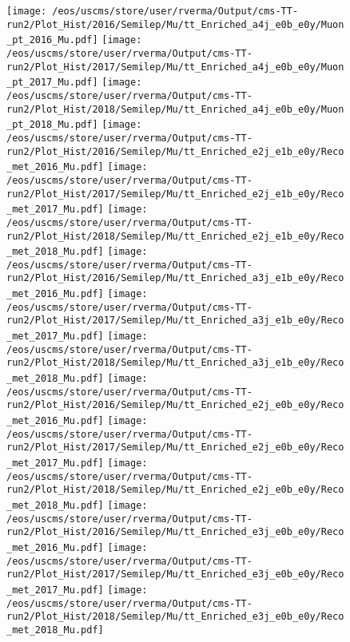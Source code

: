 \begin{figure}
\centering
\texttt{[image: /eos/uscms/store/user/rverma/Output/cms-TT-run2/Plot\_Hist/2016/Semilep/Mu/tt\_Enriched\_a4j\_e0b\_e0y/Muon\_pt\_2016\_Mu.pdf]}
\texttt{[image: /eos/uscms/store/user/rverma/Output/cms-TT-run2/Plot\_Hist/2017/Semilep/Mu/tt\_Enriched\_a4j\_e0b\_e0y/Muon\_pt\_2017\_Mu.pdf]}
\texttt{[image: /eos/uscms/store/user/rverma/Output/cms-TT-run2/Plot\_Hist/2018/Semilep/Mu/tt\_Enriched\_a4j\_e0b\_e0y/Muon\_pt\_2018\_Mu.pdf]}
\texttt{[image: /eos/uscms/store/user/rverma/Output/cms-TT-run2/Plot\_Hist/2016/Semilep/Mu/tt\_Enriched\_e2j\_e1b\_e0y/Reco\_met\_2016\_Mu.pdf]}
\texttt{[image: /eos/uscms/store/user/rverma/Output/cms-TT-run2/Plot\_Hist/2017/Semilep/Mu/tt\_Enriched\_e2j\_e1b\_e0y/Reco\_met\_2017\_Mu.pdf]}
\texttt{[image: /eos/uscms/store/user/rverma/Output/cms-TT-run2/Plot\_Hist/2018/Semilep/Mu/tt\_Enriched\_e2j\_e1b\_e0y/Reco\_met\_2018\_Mu.pdf]}
\texttt{[image: /eos/uscms/store/user/rverma/Output/cms-TT-run2/Plot\_Hist/2016/Semilep/Mu/tt\_Enriched\_a3j\_e1b\_e0y/Reco\_met\_2016\_Mu.pdf]}
\texttt{[image: /eos/uscms/store/user/rverma/Output/cms-TT-run2/Plot\_Hist/2017/Semilep/Mu/tt\_Enriched\_a3j\_e1b\_e0y/Reco\_met\_2017\_Mu.pdf]}
\texttt{[image: /eos/uscms/store/user/rverma/Output/cms-TT-run2/Plot\_Hist/2018/Semilep/Mu/tt\_Enriched\_a3j\_e1b\_e0y/Reco\_met\_2018\_Mu.pdf]}
\texttt{[image: /eos/uscms/store/user/rverma/Output/cms-TT-run2/Plot\_Hist/2016/Semilep/Mu/tt\_Enriched\_e2j\_e0b\_e0y/Reco\_met\_2016\_Mu.pdf]}
\texttt{[image: /eos/uscms/store/user/rverma/Output/cms-TT-run2/Plot\_Hist/2017/Semilep/Mu/tt\_Enriched\_e2j\_e0b\_e0y/Reco\_met\_2017\_Mu.pdf]}
\texttt{[image: /eos/uscms/store/user/rverma/Output/cms-TT-run2/Plot\_Hist/2018/Semilep/Mu/tt\_Enriched\_e2j\_e0b\_e0y/Reco\_met\_2018\_Mu.pdf]}
\texttt{[image: /eos/uscms/store/user/rverma/Output/cms-TT-run2/Plot\_Hist/2016/Semilep/Mu/tt\_Enriched\_e3j\_e0b\_e0y/Reco\_met\_2016\_Mu.pdf]}
\texttt{[image: /eos/uscms/store/user/rverma/Output/cms-TT-run2/Plot\_Hist/2017/Semilep/Mu/tt\_Enriched\_e3j\_e0b\_e0y/Reco\_met\_2017\_Mu.pdf]}
\texttt{[image: /eos/uscms/store/user/rverma/Output/cms-TT-run2/Plot\_Hist/2018/Semilep/Mu/tt\_Enriched\_e3j\_e0b\_e0y/Reco\_met\_2018\_Mu.pdf]}
\end{figure}

